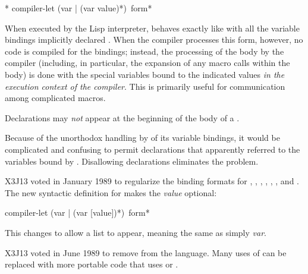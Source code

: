 
\begin{obsolete}
\begin{defspec}*
compiler-let ({var | (var value)}*) {\,form}*

When executed by the Lisp interpreter,  behaves
exactly like  with all the variable bindings implicitly
declared .  When the compiler processes this form,
however, no code is compiled for the bindings;
instead, the processing of the body by the compiler
(including, in particular, the expansion of any macro calls
within the body) is done with
the special variables bound to the indicated values {\it in the
execution context of the compiler}.  This is primarily useful for
communication among complicated macros.

Declarations may {\it not} appear at the beginning of the body
of a .

\beforenoterule
\begin{rationale}
Because of the unorthodox
handling by  of its variable bindings,
it would be complicated and confusing to permit declarations
that apparently referred to the variables bound by .
Disallowing declarations eliminates the problem.
\end{rationale}
\afternoterule

X3J13 voted in January 1989
to regularize the binding formats for , , ,
, , , and .
The new syntactic definition for  makes the {\it value} optional:

\begin{defmac}
compiler-let ({var | (var [value])}*) {\,form}*

This changes  to allow a list  to appear,
meaning the same as simply {\it var}.
\end{defmac}
\end{defspec}
\end{obsolete}

\begin{newer}
X3J13 voted in June 1989  to remove
 from the language.  Many uses of 
can be replaced with more portable code that uses 
or .
\end{newer}

\goodbreak

